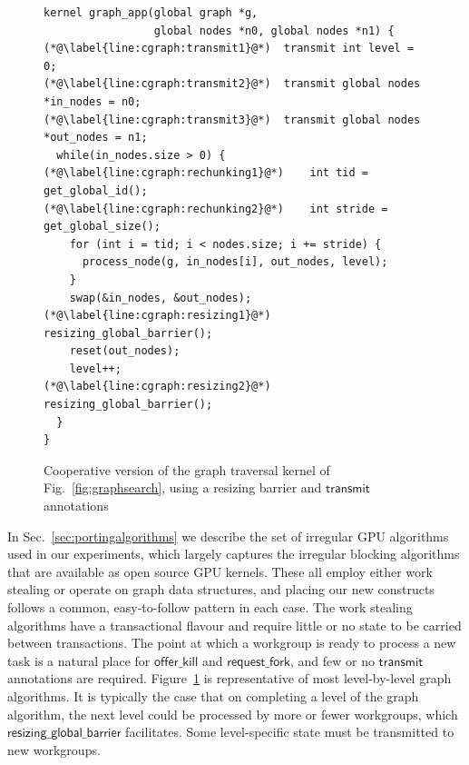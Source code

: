\documentclass[parskip=half,sigconf,review, anonymous=true, acmcopyrightmode=none]{acmart}
\newcommand{\myfig}{Fig.~}
\newcommand{\myfiglong}{Figure~}
\newcommand{\mysec}{Sec.~}
\newcommand{\transmit}{\mathsf{transmit}}
\newcommand{\offerfork}{\mathsf{request\_fork}}
\newcommand{\offerkill}{\mathsf{offer\_kill}}
\newcommand{\resizingglobalbarrier}{\mathsf{resizing\_global\_barrier}}
\begin{document}
\begin{figure}

\begin{lstlisting}
kernel graph_app(global graph *g, 
                 global nodes *n0, global nodes *n1) {
(*@\label{line:cgraph:transmit1}@*)  transmit int level = 0;
(*@\label{line:cgraph:transmit2}@*)  transmit global nodes *in_nodes = n0;
(*@\label{line:cgraph:transmit3}@*)  transmit global nodes *out_nodes = n1;
  while(in_nodes.size > 0) {
(*@\label{line:cgraph:rechunking1}@*)    int tid = get_global_id();
(*@\label{line:cgraph:rechunking2}@*)    int stride = get_global_size();
    for (int i = tid; i < nodes.size; i += stride) {
      process_node(g, in_nodes[i], out_nodes, level);
    }
    swap(&in_nodes, &out_nodes);
(*@\label{line:cgraph:resizing1}@*)    resizing_global_barrier();
    reset(out_nodes);
    level++;
(*@\label{line:cgraph:resizing2}@*)    resizing_global_barrier();
  }
}
\end{lstlisting}
\caption{Cooperative version of the graph traversal kernel of \myfig\ref{fig:graphsearch}, using a resizing barrier and $\transmit$ annotations}\label{fig:cgraphsearch}
\vspace{-4mm}
\end{figure}

In \mysec\ref{sec:portingalgorithms} we describe the set of irregular GPU algorithms used
in our experiments, which largely captures the irregular blocking
algorithms that are available as open source GPU kernels.  These all
employ either work stealing or operate on graph data structures, and placing our new constructs follows a common, easy-to-follow pattern in each case.
%
The work stealing algorithms have a transactional flavour
and require little or no state to be carried between transactions.  The point at which a workgroup is ready to process a new task is a natural place for $\offerkill$ and $\offerfork$, and few or no $\transmit$ annotations are required.
%
\myfiglong\ref{fig:cgraphsearch} is representative of
most level-by-level graph algorithms.
It is typically the case that on completing a level of
the graph algorithm, the next level could be processed by more or
fewer workgroups, which $\resizingglobalbarrier$
facilitates.  Some level-specific state must be transmitted to new workgroups.

\end{document}
